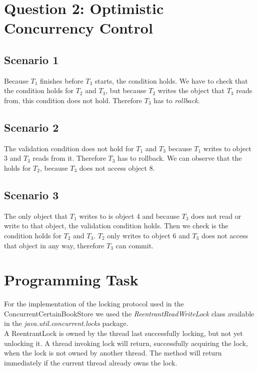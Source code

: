 \documentclass{article}      %
\begin{document}
\section*{Question 2: Optimistic Concurrency Control}

\subsection*{Scenario 1}

Because $T_1$ finishes before $T_3$ starts, the  condition holds. We have to check that the  condition holds for $T_2$ and $T_3$, but because $T_2$ writes the object that $T_3$ reads from, this condition does not hold. Therefore $T_3$ has to \emph{rollback}.\\

\subsection*{Scenario 2}

The  validation condition does not hold for $T_1$ and $T_3$ because $T_1$ writes to object 3 and $T_3$ reads from it. Therefore $T_3$ has to rollback. We can observe that the  holds for $T_2$, because $T_3$ does not access object 8.\\

\subsection*{Scenario 3}

The only object that $T_1$ writes to is object 4 and because $T_3$ does not read or write to that object, the  validation condition holds. Then we check is the  condition holds for $T_2$ and $T_3$. $T_2$ only writes to object 6 and $T_3$ does not access that object in any way, therefore $T_3$ can commit.\\

\section*{Programming Task}

For the implementation of the locking protocol used in the ConcurrentCertainBookStore we used the \emph{ReentrantReadWriteLock} class available in the \emph{java.util.concurrent.locks} package. \\

A ReentrantLock is owned by the thread last successfully locking, but not yet unlocking it. A thread invoking lock will return, successfully acquiring the lock, when the lock is not owned by another thread. The method will return immediately if the current thread already owns the lock.\\
\end{document}
